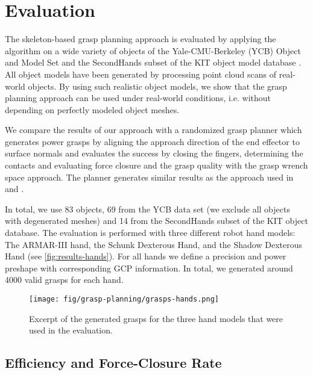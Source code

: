 \section{Evaluation}
\label{sec-eval}

The skeleton-based grasp planning approach is evaluated by applying the algorithm on a wide variety of objects of the Yale-CMU-Berkeley (YCB) Object and Model Set \cite{Calli2015} and the SecondHands subset of the KIT object model database \cite{Kasper12}. All object models have been generated by processing point cloud scans of real-world objects. By using such realistic object models, we show that the grasp planning approach can be used under real-world conditions, i.e. without depending on perfectly modeled object meshes.

We compare the results of our approach with a randomized grasp planner \cite{Vahrenkamp12b} which generates power grasps by aligning the approach direction of the end effector to surface normals and evaluates the success by closing the fingers, determining the contacts and evaluating force closure and the grasp quality with the grasp wrench space approach. The planner generates similar results as the approach used in \cite{Diankov2010} and \cite{Kappler2015}.

In total, we use 83 objects, 69 from the YCB data set (we exclude all objects with degenerated meshes) and 14 from the SecondHands subset of the KIT object database.
The evaluation is performed with three different robot hand models: The ARMAR-III hand, the Schunk Dexterous Hand, and the Shadow Dexterous Hand (see \autoref{fig:results-hands}). For all hands we define a precision and power preshape with corresponding GCP information. In total, we generated around 4000 valid grasps for each hand.

\begin{figure*}[t!]%
\centering
\texttt{[image: fig/grasp-planning/grasps-hands.png]}
\caption{Excerpt of the generated grasps for the three hand models that were used in the evaluation.}%
\label{fig:results-hands}%
\end{figure*}

\subsection{Efficiency and Force-Closure Rate}

